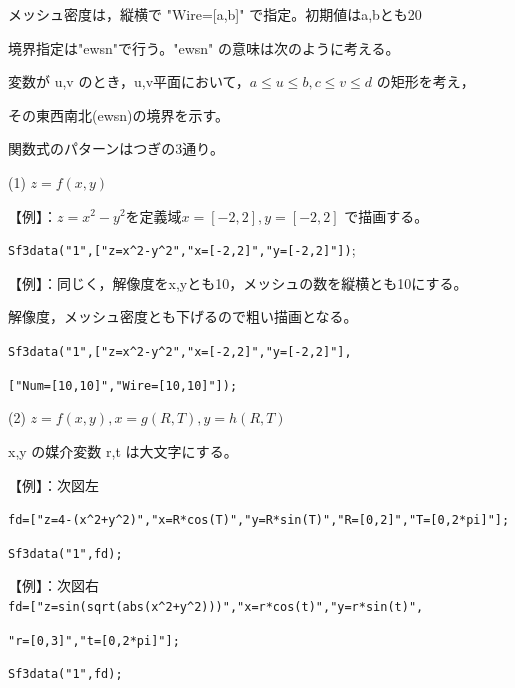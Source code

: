 \documentclass[papersize,a4paper,12pt,uplatex]{jsarticle}
\begin{document}
\begin{description}
メッシュ密度は，縦横で "Wire=[a,b]" で指定。初期値はa,bとも20

境界指定は"ewsn"で行う。"ewsn" の意味は次のように考える。

変数が u,v のとき，u,v平面において，$a \leq u \leq b,c \leq v \leq d$ の矩形を考え，

その東西南北(ewsn)の境界を示す。

 \begin{center}  \end{center}

\vspace{\baselineskip}
関数式のパターンはつぎの3通り。

\vspace{\baselineskip}
(1) $z=f(x,y)$

 【例】：$z=x^2-y^2$を定義域$x=[-2,2],y=[-2,2]$ で描画する。
  
  \verb|Sf3data("1",["z=x^2-y^2","x=[-2,2]","y=[-2,2]"])|;
      
  \begin{center}  \end{center}

 【例】：同じく，解像度をx,yとも10，メッシュの数を縦横とも10にする。
 
 解像度，メッシュ密度とも下げるので粗い描画となる。
   
\verb|Sf3data("1",["z=x^2-y^2","x=[-2,2]","y=[-2,2]"],|
      
\verb|["Num=[10,10]","Wire=[10,10]"]);|
  
\vspace{\baselineskip}
(2) $z=f(x,y),x=g(R,T),y=h(R,T)$

 x,y の媒介変数 r,t は大文字にする。
    
\vspace{\baselineskip}
【例】：次図左
  
\verb|fd=["z=4-(x^2+y^2)","x=R*cos(T)","y=R*sin(T)","R=[0,2]","T=[0,2*pi]"];|

 \verb|Sf3data("1",fd);|
    
【例】：次図右\\
 \verb|fd=["z=sin(sqrt(abs(x^2+y^2)))","x=r*cos(t)","y=r*sin(t)",|

\verb|"r=[0,3]","t=[0,2*pi]"];|
 
\verb|Sf3data("1",fd);|

  \begin{center}     \end{center}


\end{description}
\end{document}
